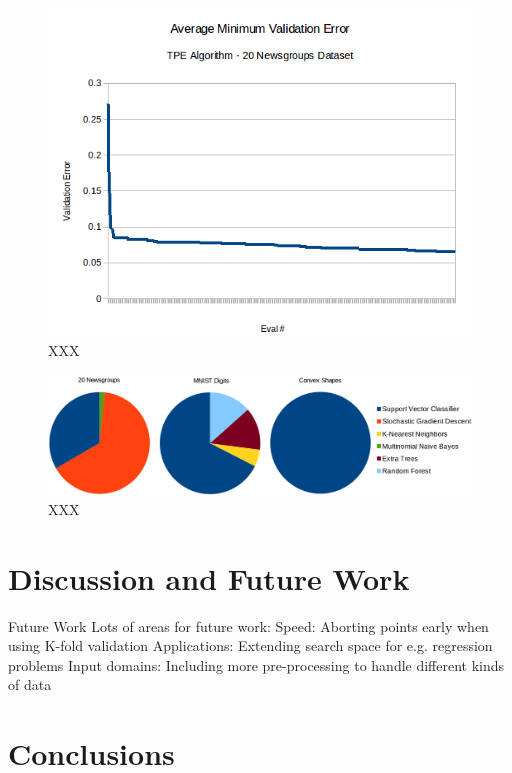 \documentclass[wcp]{jmlr}
\begin{document}
\begin{figure}
    \centering
    \includegraphics[width=\textwidth]{graphics/AvgMinValidErrorTPE}
    \caption{
	    XXX
    }
    \label{fig:errtpe}
\end{figure}

\begin{figure}
    \centering
    \includegraphics[width=\textwidth]{graphics/pie}
    \caption{
	    XXX
    }
    \label{fig:npie}
\end{figure}



\section{Discussion and Future Work}
Future Work
Lots of areas for future work:
Speed: Aborting points early when using K-fold validation
Applications: Extending search space for e.g. regression problems
Input domains: Including more pre-processing to handle different kinds of data


\section{Conclusions}




\end{document}
